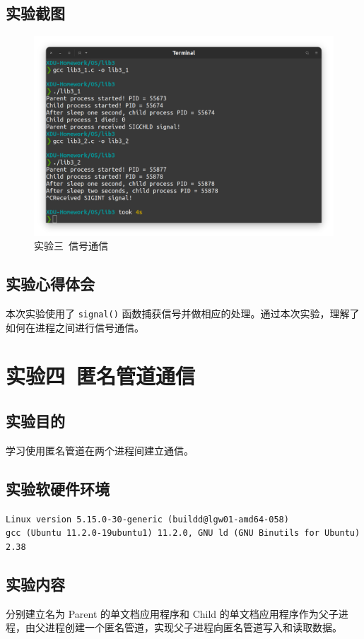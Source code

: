 \documentclass{article}
\begin{document}
		\subsection{实验截图}
			\begin{figure}[htbp]
				\centering
				\includegraphics[width=\textwidth]{lib3/Screenshot.png}
				\caption{实验三\ 信号通信}
			\end{figure}

		\subsection{实验心得体会}
			本次实验使用了 \texttt{signal()} 函数捕获信号并做相应的处理。通过本次实验，理解了如何在进程之间进行信号通信。

	\section{实验四\ 匿名管道通信}
		\subsection{实验目的}
			学习使用匿名管道在两个进程间建立通信。

		\subsection{实验软硬件环境}
			\texttt{Linux version 5.15.0-30-generic (buildd@lgw01-amd64-058) \\ gcc (Ubuntu 11.2.0-19ubuntu1) 11.2.0, GNU ld (GNU Binutils for Ubuntu) 2.38}

		\subsection{实验内容}
			分别建立名为 Parent 的单文档应用程序和 Child 的单文档应用程序作为父子进程，由父进程创建一个匿名管道，实现父子进程向匿名管道写入和读取数据。
\end{document}
